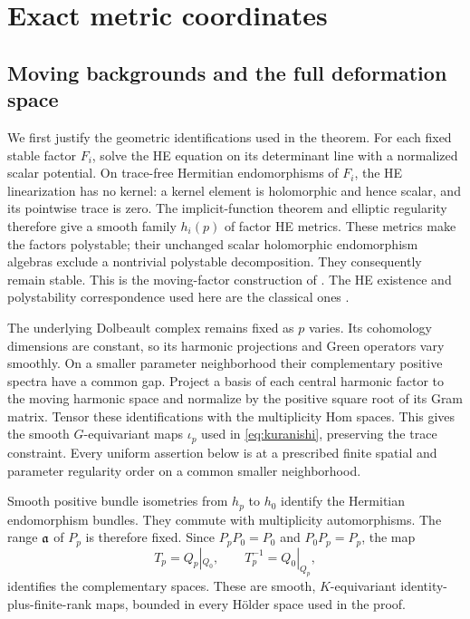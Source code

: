 \section{Exact metric coordinates}\label{sec:coordinates}

\subsection{Moving backgrounds and the full deformation space}
We first justify the geometric identifications used in the theorem.
For each fixed stable factor $F_i$, solve the HE equation on its
determinant line with a normalized scalar potential. On trace-free
Hermitian endomorphisms of $F_i$, the HE linearization has no kernel:
a kernel element is holomorphic and hence scalar, and its pointwise
trace is zero. The implicit-function theorem and elliptic regularity
therefore give a smooth family $h_i(p)$ of factor HE metrics.
These metrics make the factors polystable; their unchanged scalar
holomorphic endomorphism algebras exclude a nontrivial polystable
decomposition. They consequently remain stable. This is the
moving-factor construction of \cite[Proposition~5.1]{wuebben15}.
The HE existence and polystability correspondence used here are the
classical ones \cite{donaldson,uy,kobayashi}.

The underlying Dolbeault complex remains fixed as $p$ varies.
Its cohomology dimensions are constant, so its harmonic projections
and Green operators vary smoothly. On a smaller parameter
neighborhood their complementary positive spectra have a common
gap. Project a basis of each central harmonic factor to the moving
harmonic space and normalize by the positive square root of its
Gram matrix. Tensor these identifications with the multiplicity
Hom spaces. This gives the smooth $G$-equivariant maps $\iota_p$
used in \eqref{eq:kuranishi}, preserving the trace constraint.
Every uniform assertion below is at a prescribed finite spatial
and parameter regularity order on a common smaller neighborhood.

Smooth positive bundle isometries from $h_p$ to $h_0$ identify the
Hermitian endomorphism bundles. They commute with multiplicity
automorphisms. The range $\mathfrak a$ of $P_p$ is therefore fixed.
Since $P_pP_0=P_0$ and $P_0P_p=P_p$, the map
\begin{equation}\label{eq:complement-trivialization}
 T_p=Q_p|_{Q_0},\qquad T_p^{-1}=Q_0|_{Q_p},
\end{equation}
identifies the complementary spaces. These are smooth,
$K$-equivariant identity-plus-finite-rank maps, bounded in every
H\"older space used in the proof.

